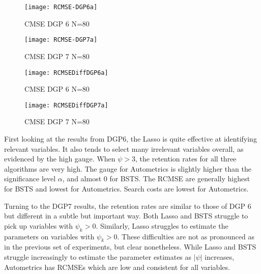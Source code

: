 \documentclass[11pt, oneside]{book}   	%
\begin{document}
\begin{figure}[h]

\begin{minipage}{.5\textwidth}
\centering
\texttt{[image: RCMSE-DGP6a]}
\caption{CMSE DGP 6 \newline N=80}
\label{fig:CMSEDGP6a}
\end{minipage}%
\begin{minipage}{.5\textwidth}
\centering
\texttt{[image: RCMSE-DGP7a]}
\caption{CMSE DGP 7 \newline N=80}
\label{fig:CMSEDGP7a}

\end{minipage}

\end{figure}




\begin{figure}[h]

\begin{minipage}{.5\textwidth}
\centering
\texttt{[image: RCMSEDiffDGP6a]}
\caption{CMSE DGP 6 \newline N=80}
\label{fig:CMSEDGP6a}
\end{minipage}%
\begin{minipage}{.5\textwidth}
\centering
\texttt{[image: RCMSEDiffDGP7a]}
\caption{CMSE DGP 7 \newline N=80}
\label{fig:CMSEDGP7a}

\end{minipage}

\end{figure}

\clearpage

First looking at the results from DGP6, the Lasso is quite effective at identifying relevant variables. It also tends to select many irrelevant variables overall, as evidenced by the high gauge. When $\psi>3$, the retention rates for all three algorithms are very high. The gauge for Autometrics is slightly higher than the significance level $\alpha$, and almost 0 for BSTS. The RCMSE are generally highest for BSTS and lowest for Autometrics. Search costs are lowest for Autometrics. 

Turning to the DGP7 results, the retention rates are similar to those of DGP 6 but different in a subtle but important way. Both Lasso and BSTS struggle to pick up variables with $\psi_{k}>0$. Similarly, Lasso struggles to estimate the parameters on variables with $\psi_{k}>0$. These difficulties are not as pronounced as in the previous set of experiments, but clear nonetheless. While Lasso and BSTS struggle increasingly to estimate the parameter estimates as $|\psi|$ increases, Autometrics has RCMSEs which are low and consistent for all variables. 
\end{document}
